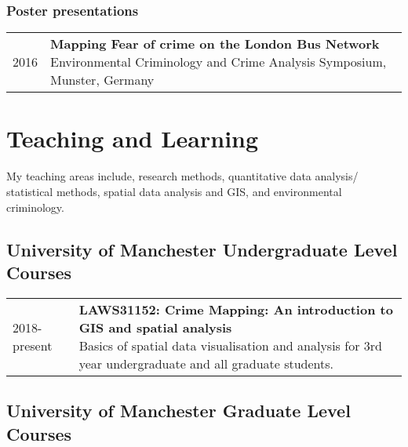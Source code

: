 \documentclass[10pt,a4paper,]{article}
\makeatletter
\def\briefitem#1#2#3{
#2 & \parbox[t]{0.85\textwidth}{%
      \textbf{#1}\\[-0.1cm]{\footnotesize #3}}\\[0.4cm]}
\def\briefsection#1{\begin{longtable}{@{\extracolsep{\fill}}ll}#1\end{longtable}}
\makeatother
\begin{document}
\hypertarget{poster-presentations}{%
\subsubsection{Poster presentations}\label{poster-presentations}}

\briefsection{\briefitem{Mapping Fear of crime on the London Bus Network}{2016}{Environmental Criminology and Crime Analysis Symposium, Munster, Germany}\briefitem{Mapping fear of crime hotspots as they vary with place, time, and individual characteristics using amobile phone app}{2015}{Home Office International Crime and Policing Conference, London, UK}\briefitem{Mapping Fear of Crime}{2013}{European Society of Criminology Conference, Budapest, Hungary}\briefitem{Mapping fear of crime as a dynamic event}{2012}{Crime Science Conference, London, UK}}

\hypertarget{teaching-and-learning}{%
\section{Teaching and Learning}\label{teaching-and-learning}}

My teaching areas include, research methods, quantitative data analysis/ statistical methods, spatial data analysis and GIS, and environmental criminology.

\hypertarget{university-of-manchester-undergraduate-level-courses}{%
\subsection{University of Manchester Undergraduate Level Courses}\label{university-of-manchester-undergraduate-level-courses}}

\briefsection{\briefitem{LAWS31152: Crime Mapping: An introduction to GIS and spatial analysis}{2018-present}{Basics of spatial data visualisation and analysis for 3rd year undergraduate and all graduate students.}\briefitem{LAWS20452 : Modelling Criminological Data}{2017-present}{Inferential statistics course for 2nd year undergraduates.}\briefitem{LAWS30620: Short Dissertation}{2017-present}{Lectures and supervision of students on secondary data analysis pathway for their final year dissertation.}\briefitem{LAWS20441: Making Sense of Criminological Data}{2016-present}{Introduction to quantitative research for 2nd year undergraduates.}}

\hypertarget{university-of-manchester-graduate-level-courses}{%
\subsection{University of Manchester Graduate Level Courses}\label{university-of-manchester-graduate-level-courses}}
\end{document}
